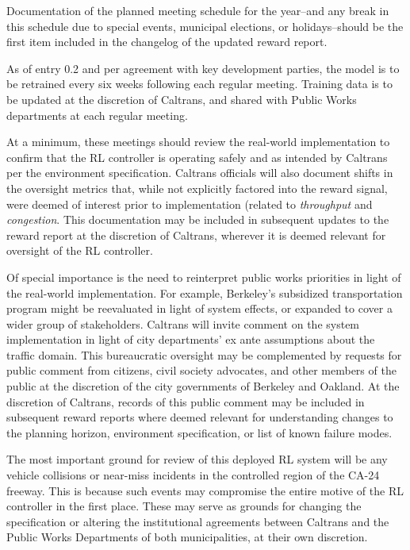 \documentclass[12pt, a4paper, twocolumn]{article}
\begin{document}
\begin{multicols}{2}
{Documentation of the planned meeting schedule for the year--and any break in this schedule due to special events, municipal elections, or holidays--should be the first item included in the changelog of the updated reward report.

As of entry 0.2 and per agreement with key development parties, the model is to be retrained every six weeks following each regular meeting. 
Training data is to be updated at the discretion of Caltrans, and shared with Public Works departments at each regular meeting.

At a minimum, these meetings should review the real-world implementation to confirm that the RL controller is operating safely and as intended by Caltrans per the environment specification. Caltrans officials will also document shifts in the oversight metrics that, while not explicitly factored into the reward signal, were deemed of interest prior to implementation (related to \textit{throughput} and \textit{congestion}. This documentation may be included in subsequent updates to the reward report at the discretion of Caltrans, wherever it is deemed relevant for oversight of the RL controller.

Of special importance is the need to reinterpret public works priorities in light of the real-world implementation. For example, Berkeley's subsidized transportation program might be reevaluated in light of system effects, or expanded to cover a wider group of stakeholders. Caltrans will invite comment on the system implementation in light of city departments' ex ante assumptions about the traffic domain. This bureaucratic oversight may be complemented by requests for public comment from citizens, civil society advocates, and other members of the public at the discretion of the city governments of Berkeley and Oakland. At the discretion of Caltrans, records of this public comment may be included in subsequent reward reports where deemed relevant for understanding changes to the planning horizon, environment specification, or list of known failure modes.

}{%

The most important ground for review of this deployed RL system will be any vehicle collisions or near-miss incidents in the controlled region of the CA-24 freeway. This is because such events may compromise the entire motive of the RL controller in the first place. These may serve as grounds for changing the specification or altering the institutional agreements between Caltrans and the Public Works Departments of both municipalities, at their own discretion.

}
\end{multicols}
\end{document}
